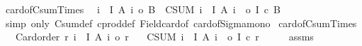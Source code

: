 \begin{isabellebody}
\endisatagproof
{\isafoldproof}%
%
\isadelimproof
\isanewline
%
\endisadelimproof
\isanewline
{}\isamarkupfalse%
\ card{\isacharunderscore}{\kern0pt}of{\isacharunderscore}{\kern0pt}Csum{\isacharunderscore}{\kern0pt}Times{\isacharcolon}{\kern0pt}\isanewline
\ \ {\isachardoublequoteopen}{\isasymforall}i\ {\isasymin}\ I{\isachardot}{\kern0pt}\ {\isacharbar}{\kern0pt}A\ i{\isacharbar}{\kern0pt}\ {\isasymle}o\ {\isacharbar}{\kern0pt}B{\isacharbar}{\kern0pt}\ {\isasymLongrightarrow}\ {\isacharparenleft}{\kern0pt}CSUM\ i\ {\isacharcolon}{\kern0pt}\ {\isacharbar}{\kern0pt}I{\isacharbar}{\kern0pt}{\isachardot}{\kern0pt}\ {\isacharbar}{\kern0pt}A\ i{\isacharbar}{\kern0pt}\ {\isacharparenright}{\kern0pt}\ {\isasymle}o\ {\isacharbar}{\kern0pt}I{\isacharbar}{\kern0pt}\ {\isacharasterisk}{\kern0pt}c\ {\isacharbar}{\kern0pt}B{\isacharbar}{\kern0pt}{\isachardoublequoteclose}\isanewline
%
\isadelimproof
%
\endisadelimproof
%
\isatagproof
{}\isamarkupfalse%
\ {\isacharparenleft}{\kern0pt}simp\ only{\isacharcolon}{\kern0pt}\ Csum{\isacharunderscore}{\kern0pt}def\ cprod{\isacharunderscore}{\kern0pt}def\ Field{\isacharunderscore}{\kern0pt}card{\isacharunderscore}{\kern0pt}of\ card{\isacharunderscore}{\kern0pt}of{\isacharunderscore}{\kern0pt}Sigma{\isacharunderscore}{\kern0pt}mono{}{\isacharparenright}{\kern0pt}%
\endisatagproof
{\isafoldproof}%
%
\isadelimproof
\isanewline
%
\endisadelimproof
\isanewline
{}\isamarkupfalse%
\ card{\isacharunderscore}{\kern0pt}of{\isacharunderscore}{\kern0pt}Csum{\isacharunderscore}{\kern0pt}Times{\isacharprime}{\kern0pt}{\isacharcolon}{\kern0pt}\isanewline
\ \ \ {\isachardoublequoteopen}Card{\isacharunderscore}{\kern0pt}order\ r{\isachardoublequoteclose}\ {\isachardoublequoteopen}{\isasymforall}i\ {\isasymin}\ I{\isachardot}{\kern0pt}\ {\isacharbar}{\kern0pt}A\ i{\isacharbar}{\kern0pt}\ {\isasymle}o\ r{\isachardoublequoteclose}\isanewline
\ \ \ {\isachardoublequoteopen}{\isacharparenleft}{\kern0pt}CSUM\ i\ {\isacharcolon}{\kern0pt}\ {\isacharbar}{\kern0pt}I{\isacharbar}{\kern0pt}{\isachardot}{\kern0pt}\ {\isacharbar}{\kern0pt}A\ i{\isacharbar}{\kern0pt}\ {\isacharparenright}{\kern0pt}\ {\isasymle}o\ {\isacharbar}{\kern0pt}I{\isacharbar}{\kern0pt}\ {\isacharasterisk}{\kern0pt}c\ r{\isachardoublequoteclose}\isanewline
%
\isadelimproof
%
\endisadelimproof
%
\isatagproof
{}\isamarkupfalse%
\ {\isacharminus}{\kern0pt}\isanewline
\ \ \isamarkupfalse%
\ assms{\isacharparenleft}{\kern0pt}{}{\isacharparenright}{\kern0pt}\ \isamarkupfalse%

\end{isabellebody}
